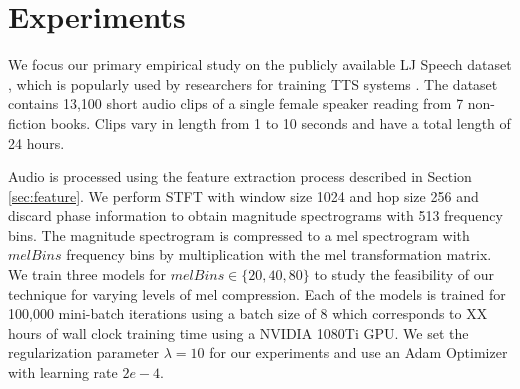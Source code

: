 \documentclass[a4paper]{article}
\begin{document}


\section{Experiments}
\label{sec:experiments}
We focus our primary empirical study on the publicly available LJ Speech dataset \cite{ljspeech}, which is popularly used by researchers for training TTS systems \cite{waveglow,r9y9}. 
The dataset contains 13,100 short audio clips of a single female speaker reading from 7 non-fiction books. Clips vary in length from 1 to 10 seconds and have a total length of 24 hours.

Audio is processed using the feature extraction process described in Section \ref{sec:feature}. We perform STFT with window size 1024 and hop size 256 and discard phase information to obtain magnitude spectrograms with 513 frequency bins. The magnitude spectrogram is compressed to a mel spectrogram with
$\mathit{melBins}$ frequency bins by multiplication with the mel transformation matrix.  
We train three models for $\mathit{melBins} \in \lbrace 20, 40, 80 \rbrace$ to study the feasibility of our technique 
for 
varying
levels of mel compression. Each of the models is trained for 100,000 mini-batch iterations using a batch size of 8 which corresponds to
XX hours of wall clock training time using a NVIDIA 1080Ti GPU. We set the regularization parameter $\lambda = 10$ for our experiments and use an Adam Optimizer with learning rate $2e-4$. 
\end{document}
